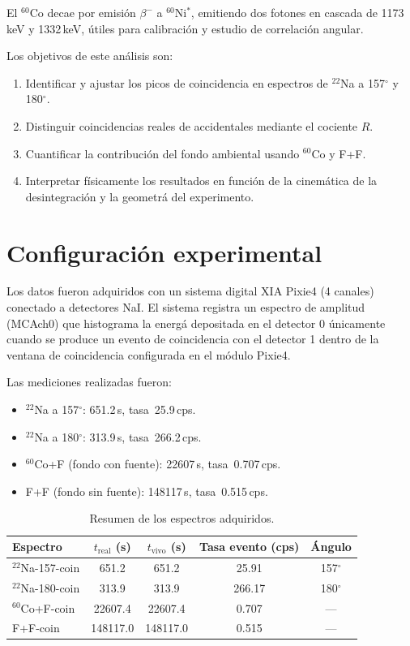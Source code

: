 \documentclass[12pt,a4paper]{article}
\begin{document}
El $^{60}$Co decae por emisi\'on $\beta^-$ a $^{60}$Ni$^*$, emitiendo dos fotones en cascada
de 1173\,keV y 1332\,keV, \'utiles para calibraci\'on y estudio de correlaci\'on angular.

Los objetivos de este an\'alisis son:
\begin{enumerate}
  \item Identificar y ajustar los picos de coincidencia en espectros de $^{22}$Na a 157$^\circ$ y 180$^\circ$.
  \item Distinguir coincidencias reales de accidentales mediante el cociente $R$.
  \item Cuantificar la contribuci\'on del fondo ambiental usando $^{60}$Co y F+F.
  \item Interpretar f\'isicamente los resultados en funci\'on de la cinem\'atica de la desintegraci\'on y la geometr\'a del experimento.
\end{enumerate}

\section{Configuraci\'on experimental}

Los datos fueron adquiridos con un sistema digital XIA Pixie4 (4 canales) conectado a detectores
NaI. El sistema registra un espectro de amplitud (MCAch0) que histograma la energ\'a depositada
en el detector 0 \'unicamente cuando se produce un evento de coincidencia con el detector 1
dentro de la ventana de coincidencia configurada en el m\'odulo Pixie4.

Las mediciones realizadas fueron:
\begin{itemize}
  \item $^{22}$Na a 157$^\circ$: 651.2\,s, tasa~25.9\,cps.
  \item $^{22}$Na a 180$^\circ$: 313.9\,s, tasa~266.2\,cps.
  \item $^{60}$Co+F (fondo con fuente): 22607\,s, tasa~0.707\,cps.
  \item F+F (fondo sin fuente): 148117\,s, tasa~0.515\,cps.
\end{itemize}

\begin{table}[htbp]
\centering
\caption{Resumen de los espectros adquiridos.}
\label{tab:resumen}
\begin{tabular}{lcccc}
\hline \hline
Espectro & $t_{\text{real}}$ (s) & $t_{\text{vivo}}$ (s) & Tasa evento (cps) & \'Angulo \\
\hline
$^{22}$Na-157-coin & 651.2 & 651.2 & 25.91 & 157$^\circ$ \\
$^{22}$Na-180-coin & 313.9 & 313.9 & 266.17 & 180$^\circ$ \\
$^{60}$Co+F-coin    & 22607.4 & 22607.4 & 0.707 & --- \\
F+F-coin           & 148117.0 & 148117.0 & 0.515 & --- \\
\hline
\end{tabular}
\end{table}
\end{document}
